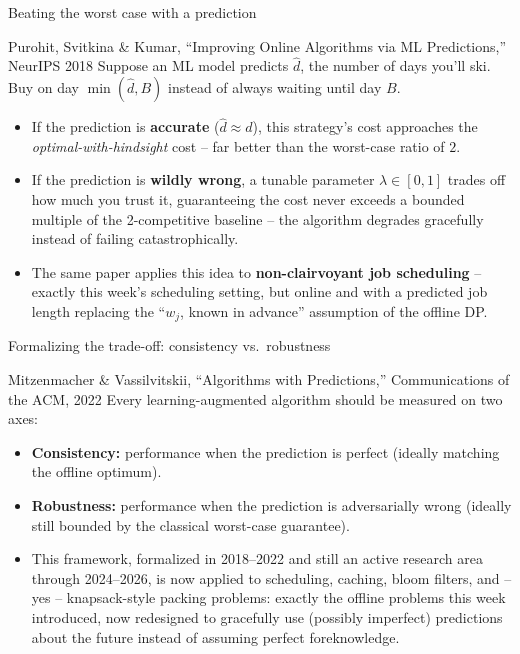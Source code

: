 \documentclass[11pt,aspectratio=169]{beamer}
\begin{document}
\begin{frame}{Beating the worst case with a prediction}
  \small
  \begin{block}{Purohit, Svitkina \& Kumar, ``Improving Online Algorithms via ML
  Predictions,'' NeurIPS 2018}
    Suppose an ML model predicts $\hat{d}$, the number of days you'll ski. Buy on day
    $\min(\hat d, B)$ instead of always waiting until day $B$.
  \end{block}
  \begin{itemize}
    \item If the prediction is \textbf{accurate} ($\hat d \approx d$), this strategy's
    cost approaches the \emph{optimal-with-hindsight} cost -- far better than the
    worst-case ratio of $2$.
    \item If the prediction is \textbf{wildly wrong}, a tunable parameter $\lambda \in
    [0,1]$ trades off how much you trust it, guaranteeing the cost never exceeds a
    bounded multiple of the 2-competitive baseline -- the algorithm degrades gracefully
    instead of failing catastrophically.
    \item The same paper applies this idea to \textbf{non-clairvoyant job scheduling} --
    exactly this week's scheduling setting, but online and with a predicted job length
    replacing the ``$w_j$, known in advance'' assumption of the offline DP.
  \end{itemize}
\end{frame}

\begin{frame}{Formalizing the trade-off: consistency vs.\ robustness}
  \small
  \begin{block}{Mitzenmacher \& Vassilvitskii, ``Algorithms with Predictions,''
  Communications of the ACM, 2022}
    Every learning-augmented algorithm should be measured on two axes:
    \begin{itemize}
      \item \textbf{Consistency:} performance when the prediction is perfect (ideally
      matching the offline optimum).
      \item \textbf{Robustness:} performance when the prediction is adversarially wrong
      (ideally still bounded by the classical worst-case guarantee).
    \end{itemize}
  \end{block}
  \begin{itemize}
    \item This framework, formalized in 2018--2022 and still an active research area
    through 2024--2026, is now applied to scheduling, caching, bloom filters, and
    -- yes -- knapsack-style packing problems: exactly the offline problems this week
    introduced, now redesigned to gracefully use (possibly imperfect) predictions about
    the future instead of assuming perfect foreknowledge.
  \end{itemize}
\end{frame}
\end{document}
